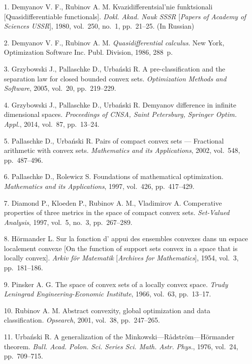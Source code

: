 

{\footnotesize

\vskip 3mm


\vskip 2mm

1. {Demyanov V. F., Rubinov A. M.} Kvazidifferentsial'nie
funktsionali [Quasidifferentiable functionals]. {\it Dokl. Akad.
Nauk SSSR} [{\it Papers of Academy of Sciences USSR}], 1980,
vol.~250, no.~1, pp.~21--25. (In Russian)
%

2. {Demyanov V. F., Rubinov A. M. } {\it Quasidifferential
calculus}. New York, Optimization Software Inc. Publ. Division,
1986, 288~p.

3. {Grzybowski J.,   Pallaschke  D.,
 Urba\'{n}ski R.}  A pre-classification and the separation law
for closed bounded convex sets. {\it Optimization Methods and
Software}, 2005,  vol.~20, pp.~219--229.

4. {Grzybowski J.,  Pallaschke  D.,
 Urba\'{n}ski R.}  Demyanov difference in infinite dimensional
 spaces. {\it Proceedings of CNSA, Saint Petersburg, Springer Optim.
Appl.}, 2014, vol.~87, pp.~13--24.

5.  {Pallaschke D., Urba\'nski R.}  Pairs of compact convex sets
--- Fractional arithmetic with convex sets. {\it Mathematics and its
Applications}, 2002, vol.~548, pp.~487--496.

6.   {Pallaschke D., Rolewicz S.} Foundations of mathematical
optimization. {\it Mathematics and its Applications}, 1997,
vol.~426,   pp.~417--429.

7. {Diamond P.,  Kloeden P., Rubinov A. M., Vladimirov A.}
Comperative properties of three metrics in the space of compact
convex sets. {\it Set-Valued Analysis}, 1997, vol.~5, no.~3,
pp.~267--289.

8.  {H\"ormander L.} Sur la fonction d' appui des ensembles
convexes dans un espace localement convexe [On the function of
support sets convex in a space that is locally convex]. {\it Arkiv
f\"or Matematik} [{\it Archives for Mathematics}], 1954, vol.~3,
pp.~181--186.

9. {Pinsker A. G. } The space of convex sets of a locally convex
space. {\it Trudy Leningrad Engineering-Economic Institute}, 1966,
vol.~63, pp.~13--17.

10. {Rubinov A. M.}  Abstract convexity, global optimization and
data classification.  {\it Opsearch}, 2001, vol.~38, pp.~247--265.

11.  {Urba\'nski  R. }  A generalization of the
Minkowski---R{\aa}dstr\"om---H\"ormander theorem. {\it Bull. Acad.
Polon. Sci. Series Sci. Math. Astr. Phys.},  1976, vol.~24,
pp.~709--715.

}
